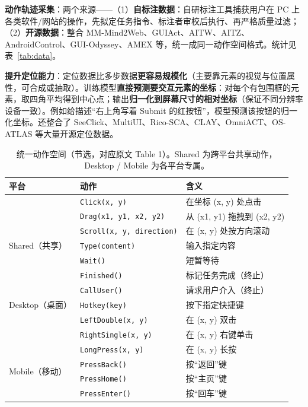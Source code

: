 \documentclass[11pt,UTF8,fontset=fandol]{ctexart}
\begin{document}
\textbf{动作轨迹采集}：两个来源——（1）\textbf{自标注数据}：自研标注工具捕获用户在 PC 上各类软件/网站的操作，先拟定任务指令、标注者审校后执行、再严格质量过滤；（2）\textbf{开源数据}：整合 MM-Mind2Web、GUIAct、AITW、AITZ、AndroidControl、GUI-Odyssey、AMEX 等，统一成同一动作空间格式。统计见表~\ref{tab:data}。

\textbf{提升定位能力}：定位数据比多步数据\textbf{更容易规模化}（主要靠元素的视觉与位置属性，可合成或抽取）。训练模型\textbf{直接预测要交互元素的坐标}：对每个有包围框的元素，取四角平均得到中心点；输出\textbf{归一化到屏幕尺寸的相对坐标}（保证不同分辨率设备一致）。例如给描述“右上角写着 Submit 的红按钮”，模型预测该按钮的归一化坐标。还整合了 SeeClick、MultiUI、Rico-SCA、CLAY、OmniACT、OS-ATLAS 等大量开源定位数据。

\begin{table}[H]\centering
\caption{统一动作空间（节选，对应原文 Table 1）。Shared 为跨平台共享动作，Desktop / Mobile 为各平台专属。}
\label{tab:action}
\small
\begin{tabular}{lll}
\toprule
平台 & 动作 & 含义 \\
\midrule
\multirow{7}{*}{Shared（共享）}
 & \texttt{Click(x, y)} & 在坐标 (x, y) 处点击 \\
 & \texttt{Drag(x1, y1, x2, y2)} & 从 (x1, y1) 拖拽到 (x2, y2) \\
 & \texttt{Scroll(x, y, direction)} & 在 (x, y) 处按方向滚动 \\
 & \texttt{Type(content)} & 输入指定内容 \\
 & \texttt{Wait()} & 短暂等待 \\
 & \texttt{Finished()} & 标记任务完成（终止） \\
 & \texttt{CallUser()} & 请求用户介入（终止） \\
\midrule
Desktop（桌面）
 & \texttt{Hotkey(key)} & 按下指定快捷键 \\
 & \texttt{LeftDouble(x, y)} & 在 (x, y) 双击 \\
 & \texttt{RightSingle(x, y)} & 在 (x, y) 右键单击 \\
\midrule
\multirow{4}{*}{Mobile（移动）}
 & \texttt{LongPress(x, y)} & 在 (x, y) 长按 \\
 & \texttt{PressBack()} & 按“返回”键 \\
 & \texttt{PressHome()} & 按“主页”键 \\
 & \texttt{PressEnter()} & 按“回车”键 \\
\bottomrule
\end{tabular}
\end{table}
\end{document}
